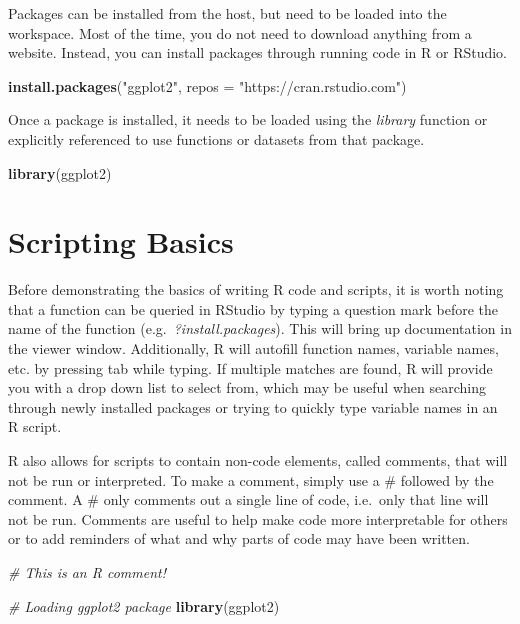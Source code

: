 \documentclass[
]{book}
\newenvironment{Shaded}{\begin{snugshade}}{\end{snugshade}}
\newcommand{\CommentTok}[1]{\textcolor[rgb]{0.56,0.35,0.01}{\textit{#1}}}
\newcommand{\DataTypeTok}[1]{\textcolor[rgb]{0.13,0.29,0.53}{#1}}
\newcommand{\KeywordTok}[1]{\textcolor[rgb]{0.13,0.29,0.53}{\textbf{#1}}}
\newcommand{\NormalTok}[1]{#1}
\newcommand{\StringTok}[1]{\textcolor[rgb]{0.31,0.60,0.02}{#1}}
\begin{document}
Packages can be installed from the host, but need to be loaded into the workspace. Most of the time, you do not need to download anything from a website. Instead, you can install packages through running code in R or RStudio.

\begin{Shaded}
\begin{Highlighting}[]
\KeywordTok{install.packages}\NormalTok{(}\StringTok{"ggplot2"}\NormalTok{, }\DataTypeTok{repos =} \StringTok{"https://cran.rstudio.com"}\NormalTok{)}
\end{Highlighting}
\end{Shaded}

Once a package is installed, it needs to be loaded using the \emph{library} function or explicitly referenced to use functions or datasets from that package.

\begin{Shaded}
\begin{Highlighting}[]
\KeywordTok{library}\NormalTok{(ggplot2)}
\end{Highlighting}
\end{Shaded}

\hypertarget{scripting-basics}{%
\section{Scripting Basics}\label{scripting-basics}}

Before demonstrating the basics of writing R code and scripts, it is worth noting that a function can be queried in RStudio by typing a question mark before the name of the function (e.g.~\emph{?install.packages}). This will bring up documentation in the viewer window. Additionally, R will autofill function names, variable names, etc. by pressing tab while typing. If multiple matches are found, R will provide you with a drop down list to select from, which may be useful when searching through newly installed packages or trying to quickly type variable names in an R script.

R also allows for scripts to contain non-code elements, called comments, that will not be run or interpreted. To make a comment, simply use a \# followed by the comment. A \# only comments out a single line of code, i.e.~only that line will not be run. Comments are useful to help make code more interpretable for others or to add reminders of what and why parts of code may have been written.

\begin{Shaded}
\begin{Highlighting}[]
\CommentTok{# This is an R comment!}

\CommentTok{# Loading ggplot2 package}
\KeywordTok{library}\NormalTok{(ggplot2)}
\end{Highlighting}
\end{Shaded}
\end{document}
